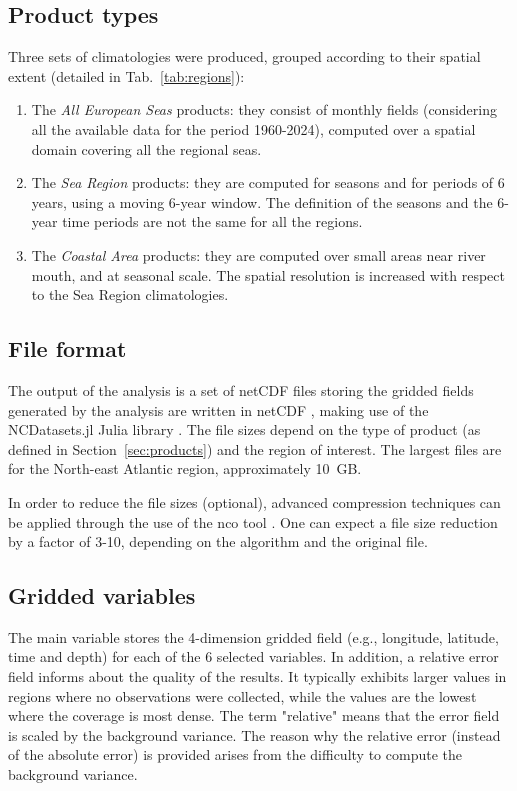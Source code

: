 \documentclass[essd,manuscript]{copernicus}
\begin{document}
\subsection{Product types\label{sec:products}}

Three sets of climatologies were produced, grouped according to their spatial extent (detailed in Tab.~\ref{tab:regions}): 
\begin{enumerate}
\item The \textit{All European Seas} products: they consist of monthly fields (considering all the available data for the period 1960-2024), computed over a spatial domain covering all the regional seas.
\item The \textit{Sea Region} products: they are computed for seasons and for periods of 6 years, using a moving 6-year window. The definition of the seasons and the 6-year time periods are not the same for all the regions. 
\item The \textit{Coastal Area} products: they are computed over small areas near river mouth, and at seasonal scale. The spatial resolution is increased with respect to the Sea Region climatologies.
\end{enumerate}

\subsection{File format}

The output of the analysis is a set of netCDF files storing the gridded fields generated by the analysis are written in netCDF \citep{Rew1990,Brown1993,Rew2006}, making use of the NCDatasets.jl Julia library \citep{Barth2024}. The file sizes depend on the type of product (as defined in Section~\ref{sec:products}) and the region of interest. The largest files are for the North-east Atlantic region, approximately 10~\unit{GB}.

In order to reduce the file sizes (optional), advanced compression techniques \citep{Silver2017,Zender2016} can be applied through the use of the nco tool \citep[netCDF operators,][]{Zender2008}. One can expect a file size reduction by a factor of 3-10, depending on the algorithm and the original file.

\subsection{Gridded variables}

The main variable stores the 4-dimension gridded field (e.g., longitude, latitude, time and depth) for each of the 6 selected variables. In addition, a relative error field informs about the quality of the results. It typically exhibits larger values in regions where no observations were collected, while the values are the lowest where the coverage is most dense. The term "relative" means that the error field is scaled by the background variance. The reason why the relative error (instead of the absolute error) is provided arises from the difficulty to compute the background variance.  
\end{document}

